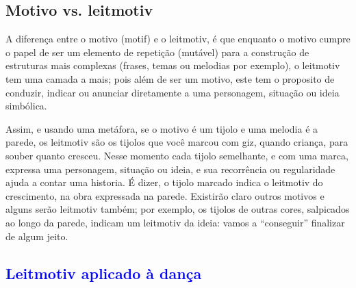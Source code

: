 \subsection{Motivo vs. leitmotiv}
A diferença entre o motivo (motif) e o leitmotiv, 
é que  enquanto o motivo cumpre o papel de ser um elemento de repetição (mutável)
para a construção de estruturas mais complexas (frases, temas ou melodias por exemplo),
o leitmotiv tem uma camada a mais; pois além de ser um motivo, 
este tem o proposito de conduzir, indicar ou anunciar diretamente
a uma personagem, situação ou ideia simbólica.

Assim, e usando uma metáfora, se o motivo é um tijolo e uma melodia é a parede, 
os leitmotiv são os tijolos que  você marcou com giz, quando criança, para souber quanto cresceu.
Nesse momento cada tijolo semelhante, e com uma marca, expressa uma personagem, situação ou ideia,
e sua recorrência ou regularidade ajuda a contar uma historia.
É dizer, o tijolo marcado indica o leitmotiv do crescimento, na obra expressada na parede.
Existirão claro outros motivos e alguns serão leitmotiv também; por exemplo, os tijolos de outras cores,
salpicados ao longo da parede, indicam um leitmotiv da ideia: vamos  a ``conseguir'' finalizar de algum jeito.



\subsection{\textcolor{blue}{Leitmotiv aplicado à dança}}

